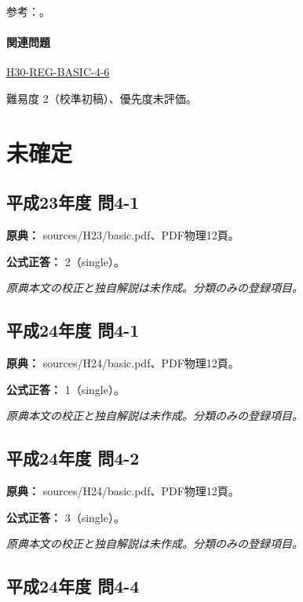 \par 参考：\cite{mit_protein}。

\paragraph{関連問題} \hyperref[q:h30-reg-basic-4-6]{H30-REG-BASIC-4-6}

\par 難易度 2（校準初稿）、優先度未評価。

\section{未確定}

\subsection{平成23年度 問4-1}
\label{q:h23-reg-basic-4-1}

\noindent\textbf{原典：} sources/H23/basic.pdf、PDF物理12頁。

\textbf{公式正答：} 2（single）。

\par\textit{原典本文の校正と独自解説は未作成。分類のみの登録項目。}

\subsection{平成24年度 問4-1}
\label{q:h24-reg-basic-4-1}

\noindent\textbf{原典：} sources/H24/basic.pdf、PDF物理12頁。

\textbf{公式正答：} 1（single）。

\par\textit{原典本文の校正と独自解説は未作成。分類のみの登録項目。}

\subsection{平成24年度 問4-2}
\label{q:h24-reg-basic-4-2}

\noindent\textbf{原典：} sources/H24/basic.pdf、PDF物理12頁。

\textbf{公式正答：} 3（single）。

\par\textit{原典本文の校正と独自解説は未作成。分類のみの登録項目。}

\subsection{平成24年度 問4-4}
\label{q:h24-reg-basic-4-4}


